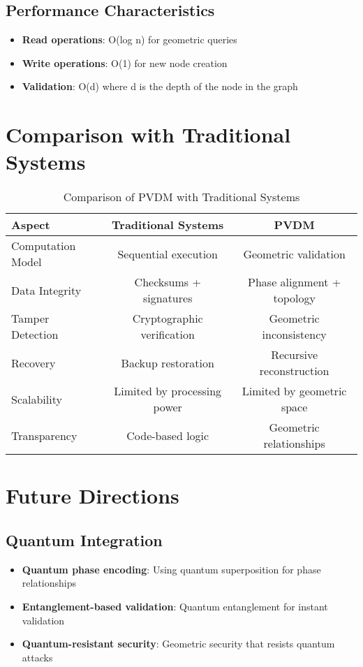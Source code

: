 \documentclass[12pt,a4paper]{article}
\begin{document}
\subsection{Performance Characteristics}
\begin{itemize}
    \item \textbf{Read operations}: O(log n) for geometric queries
    \item \textbf{Write operations}: O(1) for new node creation
    \item \textbf{Validation}: O(d) where d is the depth of the node in the graph
\end{itemize}

\section{Comparison with Traditional Systems}

\begin{table}[h]
\centering
\caption{Comparison of PVDM with Traditional Systems}
\begin{tabular}{lcc}
\toprule
\textbf{Aspect} & \textbf{Traditional Systems} & \textbf{PVDM} \\
\midrule
Computation Model & Sequential execution & Geometric validation \\
Data Integrity & Checksums + signatures & Phase alignment + topology \\
Tamper Detection & Cryptographic verification & Geometric inconsistency \\
Recovery & Backup restoration & Recursive reconstruction \\
Scalability & Limited by processing power & Limited by geometric space \\
Transparency & Code-based logic & Geometric relationships \\
\bottomrule
\end{tabular}
\end{table}

\section{Future Directions}

\subsection{Quantum Integration}
\begin{itemize}
    \item \textbf{Quantum phase encoding}: Using quantum superposition for phase relationships
    \item \textbf{Entanglement-based validation}: Quantum entanglement for instant validation
    \item \textbf{Quantum-resistant security}: Geometric security that resists quantum attacks
\end{itemize}
\end{document}
